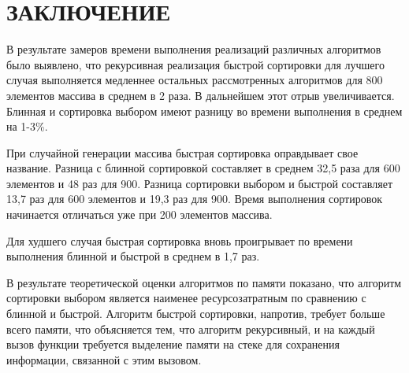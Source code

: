 \part*{ЗАКЛЮЧЕНИЕ}
В результате замеров времени выполнения реализаций различных алгоритмов было выявлено, что рекурсивная реализация быстрой сортировки для лучшего случая выполняется медленнее остальных рассмотренных алгоритмов для 800 элементов массива в среднем в 2 раза. В дальнейшем этот отрыв увеличивается. Блинная и сортировка выбором имеют разницу во времени выполнения в среднем на 1-3\%. 

При случайной генерации массива быстрая сортировка оправдывает свое название. Разница с блинной сортировкой составляет в среднем 32,5 раза для 600 элементов и 48 раз для 900. Разница сортировки выбором и быстрой составляет 13,7 раз для 600 элементов и 19,3 раз для 900. Время выполнения сортировок начинается отличаться уже при 200 элементов массива.

Для худшего случая быстрая сортировка вновь проигрывает по времени выполнения блинной и быстрой в среднем в 1,7 раз.

В результате теоретической оценки алгоритмов по памяти показано, что алгоритм сортировки выбором является наименее ресурсозатратным по сравнению с блинной и быстрой.
Алгоритм быстрой сортировки, напротив, требует больше всего памяти, что объясняется тем, что алгоритм рекурсивный, и на каждый вызов функции требуется выделение памяти на стеке для сохранения информации, связанной с этим вызовом.